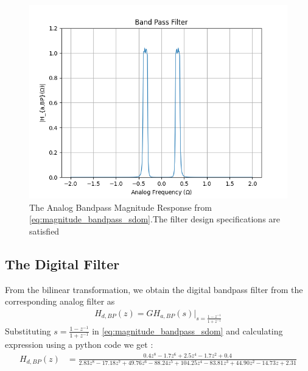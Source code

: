 \documentclass{article}
\begin{document}
\begin{enumerate}
\begin{figure}[H]
              \includegraphics[width=1\columnwidth]{figs/Band_Pass_Filter.png}
              \caption{The Analog Bandpass Magnitude Response from \eqref{eq:magnitude_bandpass_sdom}.The filter design specifications are satisfied}
              \label{fig:band_pass_filter}
          \end{figure}
\end{enumerate}

\subsection{The Digital Filter}
From the bilinear transformation, we obtain the digital bandpass filter from the corresponding analog filter as
\begin{align}
    H_{d,BP}(z) = GH_{a,BP}(s)\vert_{s = \frac{1-z^{-1}}{1 + z^{-1}}}
\end{align}
Substituting $s=\frac{1-z^{-1}}{1+z^{-1}}$ in \eqref{eq:magnitude_bandpass_sdom} and calculating expression using a python code we get :
\begin{align}
    H_{d,BP}(z) & = \frac{0.4z^8 - 1.7z^6 + 2.5z^4 - 1.7z^2 + 0.4}{2.83z^8 - 17.18z^7 + 49.76z^6 - 88.24z^5 + 104.25z^4 - 83.81z^3 + 44.90z^2 - 14.73z + 2.31}
\end{align}
\end{document}

